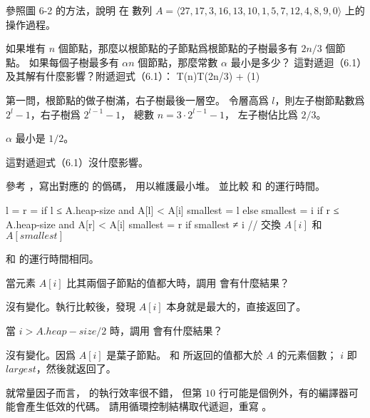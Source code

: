 \startsection[
  title={Maintaining the heap property},
]

\startEXERCISE
參照圖 6-2 的方法，說明  在
數列 $A = \langle 27, 17, 3, 16, 13, 10, 1, 5, 7, 12, 4, 8, 9, 0\rangle$ 上的操作過程。
\stopEXERCISE

\startANSWER
\startcombination[2*2]
{\externalfigure[output/e6_2_1-1]}{}
{\externalfigure[output/e6_2_1-2]}{}
{\externalfigure[output/e6_2_1-3]}{}
{}{}
\stopcombination
\stopANSWER

\startEXERCISE
如果堆有 $n$ 個節點，那麼以根節點的子節點爲根節點的子樹最多有 $2n/3$ 個節點。
如果每個子樹最多有 $\alpha n$ 個節點，那麼常數 $\alpha$ 最小是多少？
這對遞迴（6.1）及其解有什麼影響？附遞迴式（6.1）：
\startformula
T(n)\le T(2n/3) + \Theta(1)
\stopformula
\stopEXERCISE

\startANSWER
第一問，根節點的做子樹滿，右子樹最後一層空。
令層高爲 $l$，則左子樹節點數爲 $2^l - 1$，右子樹爲 $2^{l-1} - 1$，
總數 $n=3 \cdot 2^{l-1} - 1$，
左子樹佔比爲 $2/3$。

$\alpha$ 最小是 $1/2$。

這對遞迴式（6.1）沒什麼影響。
\stopANSWER

\startEXERCISE
參考 ，寫出對應的  的僞碼，
用以維護最小堆。
並比較  和  的運行時間。
\stopEXERCISE

\startANSWER
{}
\startCLRSCODE
l = 
r = 
if l ≤ A.heap-size and A[l] < A[i]
	smallest = l
else
	smallest = i
if r ≤ A.heap-size and A[r] < A[i]
	smallest = r
if smallest ≠ i
	// 交換 $A[i]$ 和 $A[smallest]$
\stopCLRSCODE

 和  的運行時間相同。
\stopANSWER

\startEXERCISE
當元素 $A[i]$ 比其兩個子節點的值都大時，調用  會有什麼結果？
\stopEXERCISE

\startANSWER
沒有變化。執行比較後，發現 $A[i]$ 本身就是最大的，直接返回了。
\stopANSWER

\startEXERCISE
當 $i > A.heap-size / 2$ 時，調用  會有什麼結果？
\stopEXERCISE

\startANSWER
沒有變化。因爲 $A[i]$ 是葉子節點。  和  所返回的值都大於 $A$ 的元素個數；
 $i$ 即 $largest$，然後就返回了。
\stopANSWER

\startEXERCISE
就常量因子而言，  的執行效率很不錯，
但第 $10$ 行可能是個例外，有的編譯器可能會產生低效的代碼。
請用循環控制結構取代遞迴，重寫 。
\stopEXERCISE

